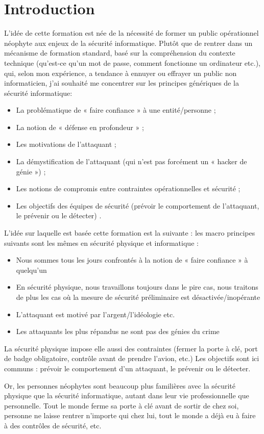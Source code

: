 \documentclass[11pt]{article} %
\begin{document}
\section{Introduction}
L'idée de cette formation est née de la nécessité de former un public
opérationnel néophyte aux enjeux de la sécurité informatique. Plutôt que de
rentrer dans un mécanisme de formation standard, basé sur la compréhension du
contexte technique (qu'est-ce qu'un mot de passe, comment fonctionne un
ordinateur etc.),
qui, selon mon expérience, a tendance à ennuyer ou effrayer un public non
informaticien, j'ai souhaité me concentrer sur les principes génériques de la
sécurité informatique:
\begin{itemize}
\item La problématique de « faire confiance » à une entité/personne ;
\item La notion de « défense en profondeur » ;
\item	Les motivations de l'attaquant ;
\item La démystification de l'attaquant (qui n'est pas forcément un « hacker de
génie ») ;
\item	Les notions de compromis entre contraintes opérationnelles et sécurité  ;
\item Les objectifs des équipes de sécurité (prévoir le comportement de
l'attaquant, le prévenir ou le détecter) .
\end{itemize}
L'idée sur laquelle est basée cette formation est la suivante : les macro
principes suivants sont les mêmes en sécurité physique et informatique :
\begin{itemize}
\item Nous sommes tous les jours confrontés à la notion de « faire confiance » à
quelqu'un
\item En sécurité physique, nous travaillons toujours dans le pire cas, nous
traitons de plus les cas où la mesure de sécurité préliminaire est
désactivée/inopérante
\item	L'attaquant est motivé par l'argent/l'idéologie etc.
\item	Les attaquants les plus répandus ne sont pas des génies du crime 
\end{itemize}
La sécurité physique impose elle aussi des contraintes (fermer la porte à clé,
port de badge obligatoire, contrôle avant de prendre l'avion, etc.)
Les objectifs sont ici communs : prévoir le comportement d'un attaquant, le
prévenir ou le détecter.

Or, les personnes néophytes sont beaucoup plus familières avec la sécurité
physique que la sécurité informatique, autant dans leur vie professionnelle que
personnelle. Tout le monde ferme sa porte à clé avant de sortir de chez soi,
personne ne laisse rentrer n'importe qui chez lui, tout le monde a déjà eu à
faire à des contrôles de sécurité, etc.
\end{document}
